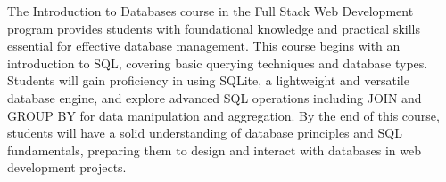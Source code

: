 The Introduction to Databases course in the Full Stack Web Development program provides students with foundational knowledge and practical skills essential for effective database management.
This course begins with an introduction to SQL, covering basic querying techniques and database types.
Students will gain proficiency in using SQLite, a lightweight and versatile database engine, and explore advanced SQL operations including JOIN and GROUP BY for data manipulation and aggregation.
By the end of this course, students will have a solid understanding of database principles and SQL fundamentals, preparing them to design and interact with databases in web development projects.
